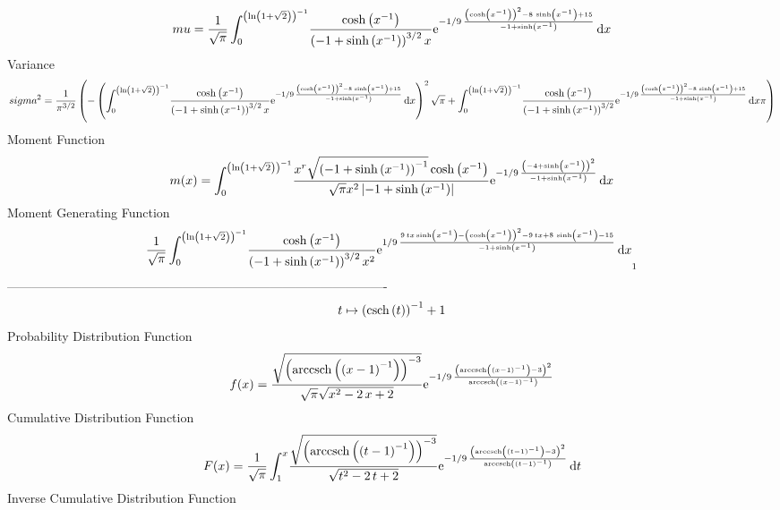 \documentclass[12pt]{article}
\begin{document}
 $$ mu={\frac {1}{\sqrt {\pi}}\int_{0}^{ \left( \ln  \left( 1+\sqrt {2}
 \right)  \right) ^{-1}}\!{\frac {\cosh \left( {x}^{-1} \right) }{
 \left( -1+\sinh \left( {x}^{-1} \right)  \right) ^{3/2}x}{{\rm e}^{-1
/9\,{\frac { \left( \cosh \left( {x}^{-1} \right)  \right) ^{2}-8\,
\sinh \left( {x}^{-1} \right) +15}{-1+\sinh \left( {x}^{-1} \right) }}
}}}\,{\rm d}x}
$$ Variance 
 $$ sigma^2 = {\frac {1}{{\pi}^{3/2}} \left( - \left( \int_{0}^{ \left( \ln  \left( 
1+\sqrt {2} \right)  \right) ^{-1}}\!{\frac {\cosh \left( {x}^{-1}
 \right) }{ \left( -1+\sinh \left( {x}^{-1} \right)  \right) ^{3/2}x}{
{\rm e}^{-1/9\,{\frac { \left( \cosh \left( {x}^{-1} \right)  \right) 
^{2}-8\,\sinh \left( {x}^{-1} \right) +15}{-1+\sinh \left( {x}^{-1}
 \right) }}}}}\,{\rm d}x \right) ^{2}\sqrt {\pi}+\int_{0}^{ \left( 
\ln  \left( 1+\sqrt {2} \right)  \right) ^{-1}}\!{\frac {\cosh \left( 
{x}^{-1} \right) }{ \left( -1+\sinh \left( {x}^{-1} \right)  \right) ^
{3/2}}{{\rm e}^{-1/9\,{\frac { \left( \cosh \left( {x}^{-1} \right) 
 \right) ^{2}-8\,\sinh \left( {x}^{-1} \right) +15}{-1+\sinh \left( {x
}^{-1} \right) }}}}}\,{\rm d}x\pi \right) }
$$Moment Function 
 $$ m(x) = \int_{0}^{ \left( \ln  \left( 1+\sqrt {2} \right)  \right) ^{-1}}\!{
\frac {{x}^{r}\sqrt { \left( -1+\sinh \left( {x}^{-1} \right) 
 \right) ^{-1}}\cosh \left( {x}^{-1} \right) }{\sqrt {\pi}{x}^{2}
 \left| -1+\sinh \left( {x}^{-1} \right)  \right| }{{\rm e}^{-1/9\,{
\frac { \left( -4+\sinh \left( {x}^{-1} \right)  \right) ^{2}}{-1+
\sinh \left( {x}^{-1} \right) }}}}}\,{\rm d}x
$$ Moment Generating Function 
 $${\frac {1}{\sqrt {\pi}}\int_{0}^{ \left( \ln  \left( 1+\sqrt {2}
 \right)  \right) ^{-1}}\!{\frac {\cosh \left( {x}^{-1} \right) }{
 \left( -1+\sinh \left( {x}^{-1} \right)  \right) ^{3/2}{x}^{2}}{
{\rm e}^{1/9\,{\frac {9\,tx\sinh \left( {x}^{-1} \right) - \left( 
\cosh \left( {x}^{-1} \right)  \right) ^{2}-9\,tx+8\,\sinh \left( {x}^
{-1} \right) -15}{-1+\sinh \left( {x}^{-1} \right) }}}}}\,{\rm d}x}_{{
1}}
$$-------------------------------------------------------------------------------------------  \\$$t\mapsto  \left( {\rm csch} \left(t\right) \right) ^{-1}+1
$$Probability Distribution Function 
$$  f(x)={\frac {\sqrt { \left( {\rm arccsch} \left( \left( x-1 \right) ^{-1}
\right) \right) ^{-3}}}{\sqrt {\pi}\sqrt {{x}^{2}-2\,x+2}}{{\rm e}^{-1
/9\,{\frac { \left( {\rm arccsch} \left( \left( x-1 \right) ^{-1}
\right)-3 \right) ^{2}}{{\rm arccsch} \left( \left( x-1 \right) ^{-1}
\right)}}}}}
$$Cumulative Distribution Function  
 $$F(x)={\frac {1}{\sqrt {\pi}}\int_{1}^{x}\!{\frac {\sqrt { \left( 
{\rm arccsch} \left( \left( t-1 \right) ^{-1}\right) \right) ^{-3}}}{
\sqrt {{t}^{2}-2\,t+2}}{{\rm e}^{-1/9\,{\frac { \left( {\rm arccsch} 
\left( \left( t-1 \right) ^{-1}\right)-3 \right) ^{2}}{{\rm arccsch} 
\left( \left( t-1 \right) ^{-1}\right)}}}}}\,{\rm d}t}
$$ Inverse Cumulative Distribution Function 
\end{document}
